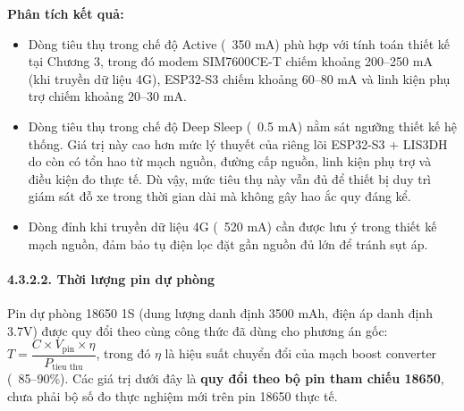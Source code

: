 \documentclass[a4paper]{extarticle}
\providecommand{\tightlist}{%
  \setlength{\itemsep}{0pt}\setlength{\parskip}{0pt}}
\begin{document}
\textbf{Phân tích kết quả:}

\begin{itemize}
\tightlist
\item
  Dòng tiêu thụ trong chế độ Active (~350 mA) phù hợp với
  tính toán thiết kế tại Chương 3, trong đó modem SIM7600CE-T chiếm
  khoảng 200--250 mA (khi truyền dữ liệu 4G), ESP32-S3 chiếm khoảng
  60--80 mA và linh kiện phụ trợ chiếm khoảng 20--30 mA.
\item
  Dòng tiêu thụ trong chế độ Deep Sleep (~0.5 mA) nằm sát
  ngưỡng thiết kế hệ thống. Giá trị này cao hơn mức lý thuyết của riêng
  lõi ESP32-S3 + LIS3DH do còn có tổn hao từ mạch nguồn, đường cấp
  nguồn, linh kiện phụ trợ và điều kiện đo thực tế. Dù vậy, mức tiêu thụ
  này vẫn đủ để thiết bị duy trì giám sát đỗ xe trong thời gian dài mà
  không gây hao ắc quy đáng kể.
\item
  Dòng đỉnh khi truyền dữ liệu 4G (~520 mA) cần được lưu ý
  trong thiết kế mạch nguồn, đảm bảo tụ điện lọc đặt gần nguồn
  đủ lớn để tránh sụt áp.
\end{itemize}

\paragraph{4.3.2.2. Thời lượng pin dự
phòng}\label{4322-thux1eddi-lux1b0ux1ee3ng-pin-dux1ef1-phuxf2ng}

Pin dự phòng 18650 1S (dung lượng danh định 3500 mAh, điện áp danh định
3.7V) được quy đổi theo cùng công thức đã dùng cho phương án gốc:
\(T = \dfrac{C \times V_{\text{pin}} \times \eta}{P_{\text{tieu thu}}}\),
trong đó \(\eta\) là hiệu suất chuyển đổi của
mạch boost converter (~85--90\%). Các giá trị dưới đây là
\textbf{quy đổi theo bộ pin tham chiếu 18650}, chưa phải bộ số đo thực
nghiệm mới trên pin 18650 thực tế.


\clearpage
\end{document}
